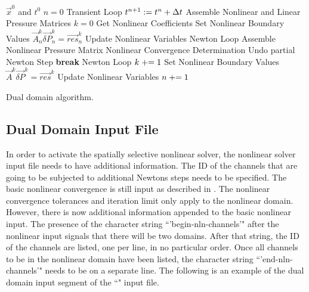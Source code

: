 \begin{algo}[ht!]
\setlength{\baselineskip}{0.625\baselineskip}
\begin{algorithmic}[1]
\Require $\vec{x}^{0}$ and $t^{0}$
\Set $n = 0$
\Loop \; Transient Loop
    \Set $t^{n+1} : = t^{n} + \dt{}$
	\Algorithm Assemble Nonlinear and Linear Pressure Matrices	 
	    \Set $k = 0$
		\Algorithm Get Nonlinear Coefficients 
		\Algorithm Set Nonlinear Boundary Values 
		\Solve $\vec{A}^{k}_{n} \vec{\delta P}_{n}^{k} = \vec{res}_{n}^{k}$	
		\Algorithm Update Nonlinear Variables  
	    \Loop \; Newton Loop
			\Algorithm Assemble Nonlinear Pressure Matrix 
			\Algorithm Nonlinear Convergence Determination 
				\State Undo partial Newton Step
				\State \textbf{break} Newton Loop 
			\EndIf		
			\Set $k \mathrel{+}= 1$
			\Algorithm Set Nonlinear Boundary Values 
			\Solve $\vec{A}^{k} \vec{\delta P}^{k} = \vec{res}^{k}$
			\Algorithm Update Nonlinear Variables 
		\EndLoop
	\EndIf
	 
	\Set $n \mathrel{+}= 1$
\EndLoop
\end{algorithmic}
\caption{Dual domain \cobra{} algorithm.}
\label{alg:domDecompAlgorithm}
\end{algo}

\subsection{Dual Domain Input File}
\label{subsect:domDecompInputFile}

In order to activate the spatially selective nonlinear solver, the nonlinear solver input file needs to have additional information.
The ID of the channels that are going to be subjected to additional Newtons steps needs to be specified.
The basic nonlinear convergence is still input as described in .
The nonlinear convergence tolerances and iteration limit only apply to the nonlinear domain.
However, there is now additional information appended to the basic nonlinear input.
The presence of the character string ``'begin-nln-channels'" after the nonlinear input signals that there will be two domains.
After that string, the ID of the channels are listed, one per line, in no particular order.
Once all channels to be in the nonlinear domain have been listed, the character string ``'end-nln-channels'" needs to be on a separate line.
The following is an example of the dual domain input segment of the ``" input file.

